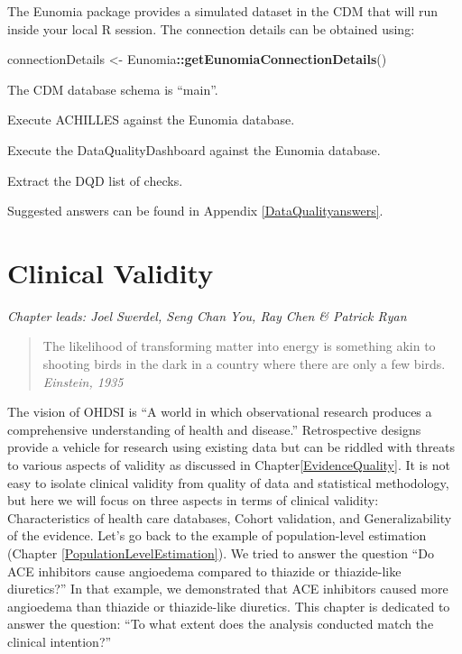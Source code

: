 \documentclass[11pt]{book}
\newenvironment{Shaded}{\begin{snugshade}}{\end{snugshade}}
\newcommand{\KeywordTok}[1]{\textcolor[rgb]{0.13,0.29,0.53}{\textbf{#1}}}
\newcommand{\StringTok}[1]{\textcolor[rgb]{0.31,0.60,0.02}{#1}}
\newcommand{\OperatorTok}[1]{\textcolor[rgb]{0.81,0.36,0.00}{\textbf{#1}}}
\newcommand{\NormalTok}[1]{#1}
\theoremstyle{definition}
\theoremstyle{definition}
\theoremstyle{definition}
\theoremstyle{remark}
\let\BeginKnitrBlock\begin \let\EndKnitrBlock\end
\begin{document}
The Eunomia package provides a simulated dataset in the CDM that will
run inside your local R session. The connection details can be obtained
using:

\begin{Shaded}
\begin{Highlighting}[]
\NormalTok{connectionDetails <-}\StringTok{ }\NormalTok{Eunomia}\OperatorTok{::}\KeywordTok{getEunomiaConnectionDetails}\NormalTok{()}
\end{Highlighting}
\end{Shaded}

The CDM database schema is ``main''.

\BeginKnitrBlock{exercise}
\protect\hypertarget{exr:exerciseRunAchilles}{}{\label{exr:exerciseRunAchilles}
}Execute ACHILLES against the Eunomia database.
\EndKnitrBlock{exercise}

\BeginKnitrBlock{exercise}
\protect\hypertarget{exr:exerciseRunDQD}{}{\label{exr:exerciseRunDQD}
}Execute the DataQualityDashboard against the Eunomia database.
\EndKnitrBlock{exercise}

\BeginKnitrBlock{exercise}
\protect\hypertarget{exr:exerciseViewDQD}{}{\label{exr:exerciseViewDQD}
}Extract the DQD list of checks.
\EndKnitrBlock{exercise}

Suggested answers can be found in Appendix \ref{DataQualityanswers}.

\chapter{Clinical Validity}\label{ClinicalValidity}

\emph{Chapter leads: Joel Swerdel, Seng Chan You, Ray Chen \& Patrick
Ryan}

\begin{quote}
The likelihood of transforming matter into energy is something akin to
shooting birds in the dark in a country where there are only a few
birds. \emph{Einstein, 1935}
\end{quote}

The vision of OHDSI is ``A world in which observational research
produces a comprehensive understanding of health and disease.''
Retrospective designs provide a vehicle for research using existing data
but can be riddled with threats to various aspects of validity as
discussed in Chapter\ref{EvidenceQuality}. It is not easy to isolate
clinical validity from quality of data and statistical methodology, but
here we will focus on three aspects in terms of clinical validity:
Characteristics of health care databases, Cohort validation, and
Generalizability of the evidence. Let's go back to the example of
population-level estimation (Chapter \ref{PopulationLevelEstimation}).
We tried to answer the question ``Do ACE inhibitors cause angioedema
compared to thiazide or thiazide-like diuretics?'' In that example, we
demonstrated that ACE inhibitors caused more angioedema than thiazide or
thiazide-like diuretics. This chapter is dedicated to answer the
question: ``To what extent does the analysis conducted match the
clinical intention?'' 
\end{document}
